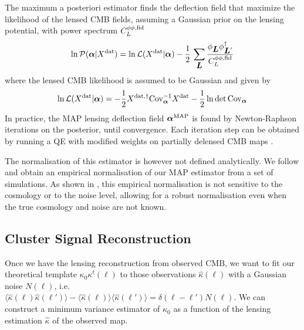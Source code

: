 \documentclass[prd, superscriptaddress, tightenlines, longbibliography, nofootinbib, eqsecnum, amsfonts, amsmath, floatfix, twocolumn, notitlepage]{revtex4-2}
\newcommand{\Cov}[0]{ {\rm{Cov}} }
\newcommand{\bs}[1]{\boldsymbol{#1}}
\begin{document}
The maximum a posteriori estimator finds the deflection field that maximize the likelihood of the lensed CMB fields, assuming a Gaussian prior on the lensing potential, with power spectrum $C_L^{\phi\phi, \rm fid}$
\begin{equation}
    \ln \mathcal{P}({\boldsymbol{\alpha}} | X^{\rm dat}) = \ln \mathcal{L}( X^{\rm dat} | {\boldsymbol{\alpha}}) - \frac{1}{2} \, \sum_{\mbox{\boldmath{$L$}}} \frac{\phi_{\mbox{\boldmath{$L$}}} \phi_{{\mbox{\boldmath{$L$}}}'}^\dagger}{C_L^{\phi\phi, \rm fid}}
\end{equation}
where the lensed CMB likelihood is assumed to be Gaussian and given by 
\begin{equation}
    \ln \mathcal{L}( X^{\rm dat} | \valpha) = -\frac{1}{2} X^{\rm dat, \dagger }\Cov_\valpha^{-1} X^{\rm dat} - \frac{1}{2}\ln \det \Cov_\valpha
\end{equation}
In practice, the MAP lensing deflection field ${\boldsymbol{\alpha}}^{\rm MAP}$ is found by Newton-Raphson iterations on the posterior, until convergence. Each iteration step can be obtained by running a QE with modified weights on partially delensed CMB maps  \cite[see][for more details]{Carron:2017mqf}.

The normalisation of this estimator is however not defined analytically. We follow \cite{Legrand:2021qdu,Legrand:2023jne} and obtain an empirical normalisation of our MAP estimator from a set of simulations. As shown in \cite{Legrand:2021qdu,Legrand:2023jne}, this empirical normalisation is not sensitive to the cosmology or to the noise level, allowing for a robust normalisation even when the true cosmology and noise are not known.  


\subsection{Cluster Signal Reconstruction}
Once we have the lensing reconstruction from observed CMB, we want to fit our theoretical template $\kappa_0\kappa^t (\bs\ell)$ to those observations $\hat \kappa (\bs\ell)$ with a Gaussian noise $N(\bs\ell)$, i.e. $\langle{\hat\kappa (\bs\ell) \hat\kappa (\bs\ell')}\rangle -  \langle{\hat \kappa (\bs\ell)}\rangle \langle \hat \kappa (\bs{\ell}') \rangle = \delta(\bs\ell - \bs\ell') N (\bs\ell)$. We can construct a minimum variance estimator of $\kappa_0$ as a function of the lensing estimation $\hat{\kappa}$ of the observed map. 
\end{document}
